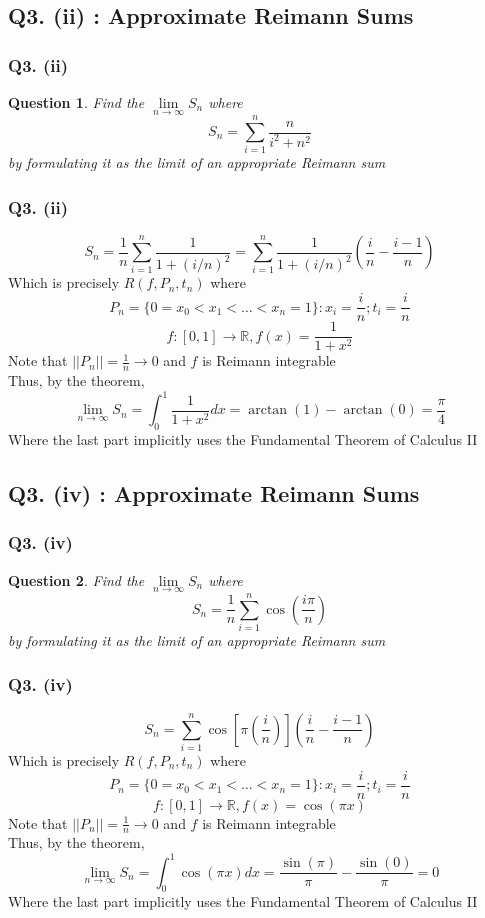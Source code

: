 \documentclass[handout,aspectratio=169]{beamer}
\newtheorem{qsn}{Question}
\newcommand{\bR}{\mathbb{R}}
\begin{document}
\subsection{Q3. (ii) : Approximate Reimann Sums}

\begin{frame}
\frametitle{Q3. (ii)}
\pause
\begin{qsn}
Find the $\lim\limits_{n\to\infty} S_n$ where 
$$S_n = \sum\limits_{i=1}^n \frac{n}{i^2+n^2}$$
by formulating it as the limit of an appropriate Reimann sum
\end{qsn}
\end{frame}

\begin{frame}
\frametitle{Q3. (ii)}
\pause
$$S_n = \frac{1}{n} \sum\limits_{i=1}^n \frac{1}{1+(i/n)^2} = \sum\limits_{i=1}^n \frac{1}{1+(i/n)^2}\left(\frac{i}{n}-\frac{i-1}{n}\right)$$ \pause
Which is precisely $R(f,P_n,t_n)$ where \pause
$$P_n = \{0=x_0<x_1<\dots<x_n=1\} : x_i = \frac{i}{n};t_i = \frac{i}{n}$$ \pause
$$f:[0,1]\to \bR, f(x) = \frac{1}{1+x^2}$$ \pause
Note that $||P_n|| = \frac{1}{n} \to 0$ and $f$ is Reimann integrable \\ \pause
Thus, by the theorem, $$\lim\limits_{n\to\infty} S_n = \int_0^1 \frac{1}{1+x^2}dx = \arctan(1)-\arctan(0) = \frac{\pi}{4}$$ \pause
Where the last part implicitly uses the Fundamental Theorem of Calculus II
\end{frame}

\subsection{Q3. (iv) : Approximate Reimann Sums}

\begin{frame}
\frametitle{Q3. (iv)}
\pause
\begin{qsn}
Find the $\lim\limits_{n\to\infty} S_n$ where 
$$S_n = \frac{1}{n}\sum\limits_{i=1}^n \cos\left(\frac{i\pi}{n}\right)$$
by formulating it as the limit of an appropriate Reimann sum
\end{qsn}
\end{frame}

\begin{frame}
\frametitle{Q3. (iv)}
\pause
$$S_n = \sum\limits_{i=1}^n \cos\left[\pi\left(\frac{i}{n}\right)\right] \left(\frac{i}{n}-\frac{i-1}{n}\right)$$ \pause
Which is precisely $R(f,P_n,t_n)$ where \pause
$$P_n = \{0=x_0<x_1<\dots<x_n=1\} : x_i = \frac{i}{n};t_i = \frac{i}{n}$$ \pause
$$f:[0,1]\to \bR, f(x) = \cos(\pi x)$$ \pause
Note that $||P_n|| = \frac{1}{n} \to 0$ and $f$ is Reimann integrable \\ \pause
Thus, by the theorem, $$\lim\limits_{n\to\infty} S_n = \int_0^1 \cos(\pi x) dx = \frac{\sin(\pi)}{\pi} - \frac{\sin(0)}{\pi} = 0$$ \pause
Where the last part implicitly uses the Fundamental Theorem of Calculus II
\end{frame}
\end{document}
